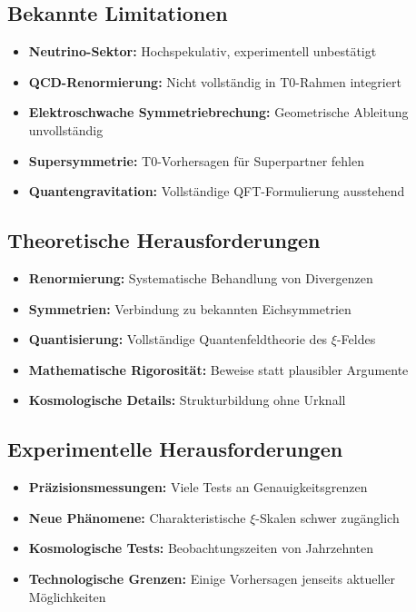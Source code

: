 \documentclass[12pt,a4paper]{article}
\begin{document}
	\subsection{Bekannte Limitationen}
	
	\begin{itemize}
		\item \textbf{Neutrino-Sektor:} Hochspekulativ, experimentell unbestätigt
		\item \textbf{QCD-Renormierung:} Nicht vollständig in T0-Rahmen integriert
		\item \textbf{Elektroschwache Symmetriebrechung:} Geometrische Ableitung unvollständig
		\item \textbf{Supersymmetrie:} T0-Vorhersagen für Superpartner fehlen
		\item \textbf{Quantengravitation:} Vollständige QFT-Formulierung ausstehend
	\end{itemize}
	
	\subsection{Theoretische Herausforderungen}
	
	\begin{itemize}
		\item \textbf{Renormierung:} Systematische Behandlung von Divergenzen
		\item \textbf{Symmetrien:} Verbindung zu bekannten Eichsymmetrien
		\item \textbf{Quantisierung:} Vollständige Quantenfeldtheorie des $\xi$-Feldes
		\item \textbf{Mathematische Rigorosität:} Beweise statt plausibler Argumente
		\item \textbf{Kosmologische Details:} Strukturbildung ohne Urknall
	\end{itemize}
	
	\subsection{Experimentelle Herausforderungen}
	
	\begin{itemize}
		\item \textbf{Präzisionsmessungen:} Viele Tests an Genauigkeitsgrenzen
		\item \textbf{Neue Phänomene:} Charakteristische $\xi$-Skalen schwer zugänglich
		\item \textbf{Kosmologische Tests:} Beobachtungszeiten von Jahrzehnten
		\item \textbf{Technologische Grenzen:} Einige Vorhersagen jenseits aktueller Möglichkeiten
	\end{itemize}
	
\end{document}
